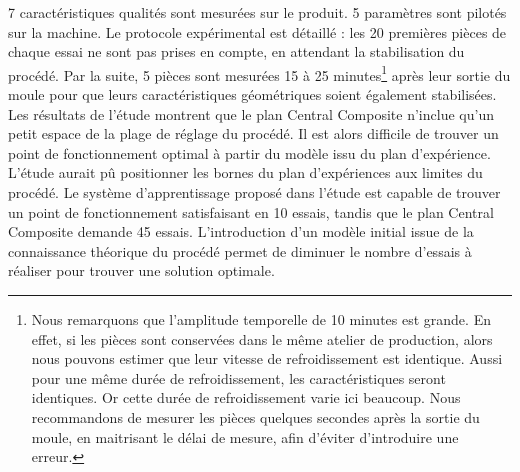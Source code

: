 7 caractéristiques qualités sont mesurées sur le produit.
5 paramètres sont pilotés sur la machine.  %
Le protocole expérimental est détaillé : les 20 premières pièces de chaque essai ne sont pas prises en compte, en attendant la stabilisation du procédé.
Par la suite, 5 pièces sont mesurées 15 à 25 minutes\footnote{
	Nous remarquons que l'amplitude temporelle de 10 minutes est grande.
	En effet, si les pièces sont conservées dans le même atelier de production, alors nous pouvons estimer que leur vitesse de refroidissement est identique.
	Aussi pour une même durée de refroidissement, les caractéristiques seront identiques.
	Or cette durée de refroidissement varie ici beaucoup. 
	Nous recommandons de mesurer les pièces quelques secondes après la sortie du moule, en maitrisant le délai de mesure, afin d'éviter d'introduire une erreur.} après leur sortie du moule pour que leurs caractéristiques géométriques soient également stabilisées.
Les résultats de l'étude montrent que le plan Central Composite n'inclue qu'un petit espace de la plage de réglage du procédé.
Il est alors difficile de trouver un point de fonctionnement optimal à partir du modèle issu du plan d’expérience.
L'étude aurait pû positionner les bornes du plan d'expériences aux limites du procédé.
Le système d'apprentissage proposé dans l'étude est capable de trouver un point de fonctionnement satisfaisant en 10 essais, tandis que le plan Central Composite demande 45 essais.
L'introduction d'un modèle initial issue de la connaissance théorique du procédé permet de diminuer le nombre d'essais à réaliser pour trouver une solution optimale.

